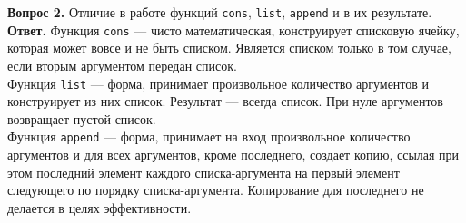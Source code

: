\documentclass[12pt]{report}
\begin{document}
\textbf{Вопрос 2.} Отличие в работе функций \texttt{cons}, \texttt{list}, \texttt{append} и в их результате. \newline
\indent\textbf{Ответ. }Функция \texttt{cons} --- чисто математическая, конструирует списковую ячейку, которая может вовсе и не быть списком. Является списком только в том случае, если вторым аргументом передан список.\\

Функция \texttt{list} --- форма, принимает произвольное количество аргументов и конструирует из них список. Результат --- всегда список. При нуле аргументов возвращает пустой список.\\

Функция \texttt{append} --- форма, принимает на вход произвольное количество аргументов и для всех аргументов, кроме последнего, создает копию, ссылая при этом последний элемент каждого списка-аргумента на первый элемент следующего по порядку списка-аргумента. Копирование для последнего не делается в целях эффективности.\\
	
	
	
	
\end{document}
